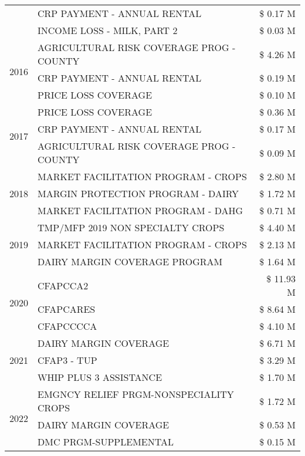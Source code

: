 \begin{tabular}{llr}
 & CRP PAYMENT - ANNUAL RENTAL & \$ 0.17 M \\
 & INCOME LOSS - MILK, PART 2 & \$ 0.03 M \\
\cline{1-3}
\multirow[t]{3}{*}{2016} & AGRICULTURAL RISK COVERAGE PROG - COUNTY & \$ 4.26 M \\
 & CRP PAYMENT - ANNUAL RENTAL & \$ 0.19 M \\
 & PRICE LOSS COVERAGE & \$ 0.10 M \\
\cline{1-3}
\multirow[t]{3}{*}{2017} & PRICE LOSS COVERAGE & \$ 0.36 M \\
 & CRP PAYMENT - ANNUAL RENTAL & \$ 0.17 M \\
 & AGRICULTURAL RISK COVERAGE PROG - COUNTY & \$ 0.09 M \\
\cline{1-3}
\multirow[t]{3}{*}{2018} & MARKET FACILITATION PROGRAM - CROPS & \$ 2.80 M \\
 & MARGIN PROTECTION PROGRAM - DAIRY & \$ 1.72 M \\
 & MARKET FACILITATION PROGRAM - DAHG & \$ 0.71 M \\
\cline{1-3}
\multirow[t]{3}{*}{2019} & TMP/MFP 2019 NON SPECIALTY CROPS & \$ 4.40 M \\
 & MARKET FACILITATION PROGRAM - CROPS & \$ 2.13 M \\
 & DAIRY MARGIN COVERAGE PROGRAM & \$ 1.64 M \\
\cline{1-3}
\multirow[t]{3}{*}{2020} & CFAPCCA2 & \$ 11.93 M \\
 & CFAPCARES & \$ 8.64 M \\
 & CFAPCCCCA & \$ 4.10 M \\
\cline{1-3}
\multirow[t]{3}{*}{2021} & DAIRY MARGIN COVERAGE & \$ 6.71 M \\
 & CFAP3 - TUP & \$ 3.29 M \\
 & WHIP PLUS 3 ASSISTANCE & \$ 1.70 M \\
\cline{1-3}
\multirow[t]{3}{*}{2022} & EMGNCY RELIEF PRGM-NONSPECIALITY CROPS & \$ 1.72 M \\
 & DAIRY MARGIN COVERAGE & \$ 0.53 M \\
 & DMC PRGM-SUPPLEMENTAL & \$ 0.15 M \\
\cline{1-3}
\bottomrule
\end{tabular}
